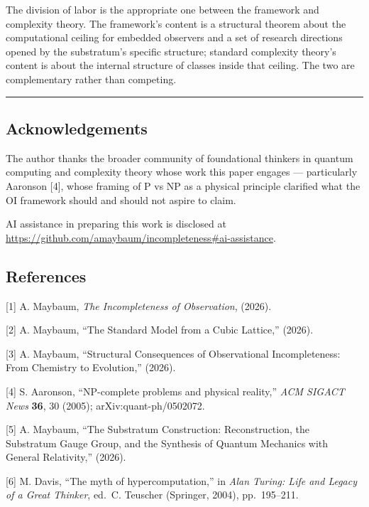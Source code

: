 \documentclass[
]{article}
\begin{document}
The division of labor is the appropriate one between the framework and
complexity theory. The framework's content is a structural theorem about
the computational ceiling for embedded observers and a set of research
directions opened by the substratum's specific structure; standard
complexity theory's content is about the internal structure of classes
inside that ceiling. The two are complementary rather than competing.

\begin{center}\rule{0.5\linewidth}{0.5pt}\end{center}

\hypertarget{acknowledgements}{%
\subsection{Acknowledgements}\label{acknowledgements}}

The author thanks the broader community of foundational thinkers in
quantum computing and complexity theory whose work this paper engages
--- particularly Aaronson {[}4{]}, whose framing of P vs NP as a
physical principle clarified what the OI framework should and should not
aspire to claim.

AI assistance in preparing this work is disclosed at\\
\url{https://github.com/amaybaum/incompleteness\#ai-assistance}.

\hypertarget{references}{%
\subsection{References}\label{references}}

{[}1{]} A. Maybaum, \emph{The Incompleteness of Observation}, (2026).

{[}2{]} A. Maybaum, ``The Standard Model from a Cubic Lattice,'' (2026).

{[}3{]} A. Maybaum, ``Structural Consequences of Observational
Incompleteness: From Chemistry to Evolution,'' (2026).

{[}4{]} S. Aaronson, ``NP-complete problems and physical reality,''
\emph{ACM SIGACT News} \textbf{36}, 30 (2005); arXiv:quant-ph/0502072.

{[}5{]} A. Maybaum, ``The Substratum Construction: Reconstruction, the
Substratum Gauge Group, and the Synthesis of Quantum Mechanics with
General Relativity,'' (2026).

{[}6{]} M. Davis, ``The myth of hypercomputation,'' in \emph{Alan
Turing: Life and Legacy of a Great Thinker}, ed.~C. Teuscher (Springer,
2004), pp.~195--211.
\end{document}
